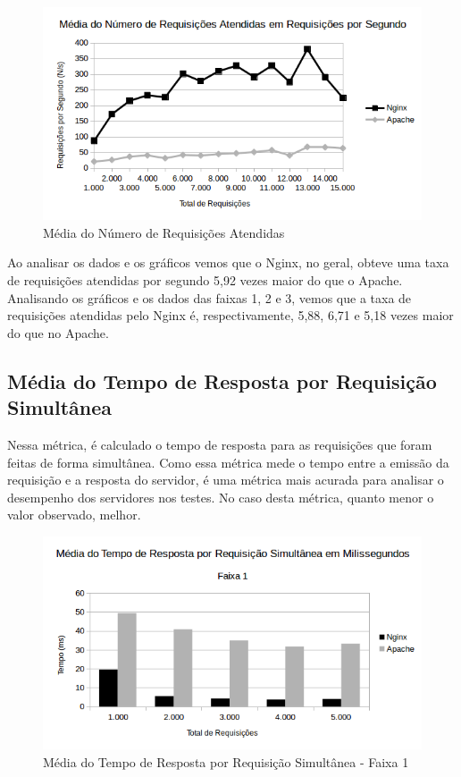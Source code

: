\begin{figure}[H]
	\centering
	\includegraphics[width=1\linewidth]{graficos/grafico4} 
	\caption{Média do Número de Requisições Atendidas}
	\label{fig:grafico4}
\end{figure}

Ao analisar os dados e os gráficos vemos que o Nginx, no geral, obteve uma taxa 
de requisições atendidas por segundo 5,92 vezes maior do que o Apache. 
Analisando os gráficos e os dados das faixas 1, 2 e 3, vemos que a taxa de 
requisições atendidas pelo Nginx é, respectivamente, 5,88, 6,71 e 5,18 vezes 
maior do que no Apache.

\subsection{Média do Tempo de Resposta por Requisição Simultânea}

Nessa métrica, é calculado o tempo de resposta para as requisições que foram 
feitas de forma simultânea. Como essa métrica mede o tempo entre a emissão da 
requisição e a resposta do servidor, é uma métrica mais acurada para analisar o 
desempenho dos servidores nos testes. No caso desta métrica, quanto menor o 
valor observado, melhor.

\begin{figure}[H]
	\centering
	\includegraphics[width=1\linewidth]{graficos/grafico5-f1} 
	\caption{Média do Tempo de Resposta por Requisição Simultânea - Faixa 1}
	\label{fig:grafico5-f1}
\end{figure}

